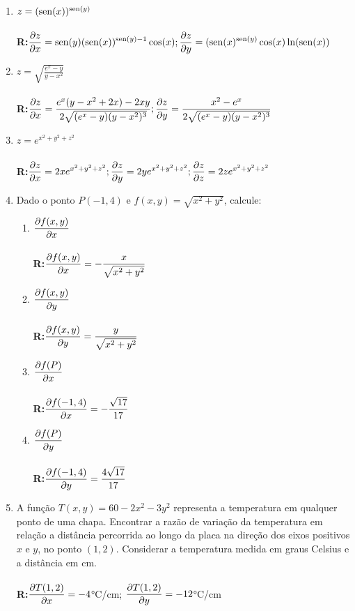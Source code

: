 \documentclass[oneside,a4paper,12pt]{article}
\newcommand{\sen}{{\rm sen}}
\newcommand{\R}{\\{\bf R:}}
\begin{document}
\begin{enumerate}
            \item $z = (\sen(x))^{\sen(y)}$\\\R $\displaystyle \pdv{z}{x} = \sen(y)(\sen(x))^{\sen(y)-1}\cos(x); \displaystyle \pdv{z}{y} = (\sen(x)^{\sen(y)}\cos(x)\ln(\sen(x))$
            \item $z = \displaystyle \sqrt{\frac{e^x-y}{y-x^2}}$\\\R $\displaystyle \pdv{z}{x} = \frac{e^x(y-x^2+2x)-2xy}{2\sqrt{(e^x-y)(y-x^2)^3}}; \displaystyle \pdv{z}{y} = \frac{x^2-e^x}{2\sqrt{(e^x-y)(y-x^2)^3}}$
            \item $z = e^{x^2+y^2+z^2}$ \\\R $\displaystyle \pdv{z}{x} = 2xe^{x^2+y^2+z^2}; \displaystyle \pdv{z}{y} = 2ye^{x^2+y^2+z^2};\displaystyle \pdv{z}{z} = 2ze^{x^2+y^2+z^2}$
    \item Dado o ponto $P(-1,4)$ e $f(x,y) = \sqrt{x^2+y^2}$, calcule:
        \begin{enumerate}
            \item $\displaystyle \pdv{f(x,y)}{x}$\\\R $\displaystyle \pdv{f(x,y)}{x} = - \frac{x}{\sqrt{x^2+y^2}}$
            \item $\displaystyle \pdv{f(x,y)}{y}$\\\R $\displaystyle \pdv{f(x,y)}{y} = \frac{y}{\sqrt{x^2+y^2}}$
            \item $\displaystyle \pdv{f(P)}{x}$ \\\R $\displaystyle \pdv{f(-1,4)}{x} = -\frac{\sqrt{17}}{17}$
            \item $\displaystyle \pdv{f(P)}{y}$ \\\R $\displaystyle \pdv{f(-1,4)}{y} = \frac{4\sqrt{17}}{17}$
        \end{enumerate}
    \item A função $T(x,y) = 60-2x^2-3y^2$ representa a temperatura em qualquer ponto de uma chapa. Encontrar a razão de variação da temperatura em relação a distância percorrida ao longo da placa na direção dos eixos positivos $x$ e $y$, no ponto $(1,2)$. Considerar a temperatura medida em graus Celsius e a distância em cm. \\\R $\displaystyle \pdv{T(1,2)}{x}=-4$°C/cm; $\displaystyle \pdv{T(1,2)}{y} = -12$°C/cm


\end{enumerate}
\end{document}
